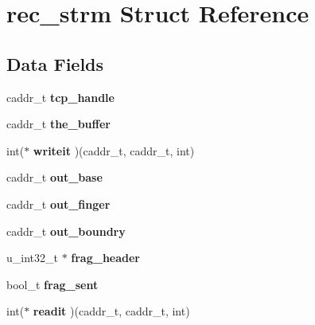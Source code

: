 \hypertarget{structrec__strm}{}\section{rec\+\_\+strm Struct Reference}
\label{structrec__strm}
\subsection*{Data Fields}
\begin{DoxyCompactItemize}
\item 
\mbox{\label{structrec__strm_a00be57c22e384888e493f40ff7fbab8c}} 
caddr\+\_\+t {\bfseries tcp\+\_\+handle}
\item 
\mbox{\label{structrec__strm_ae8bff9cab45be0d3484f0e7423533b4d}} 
caddr\+\_\+t {\bfseries the\+\_\+buffer}
\item 
\mbox{\label{structrec__strm_a5850837793c54c6c423088a36c7ea468}} 
int($\ast$ {\bfseries writeit} )(caddr\+\_\+t, caddr\+\_\+t, int)
\item 
\mbox{\label{structrec__strm_ac8ad744330bef112ca71cf73693853a8}} 
caddr\+\_\+t {\bfseries out\+\_\+base}
\item 
\mbox{\label{structrec__strm_ada87873ecbdf5e8b03eb5565b4ce93d7}} 
caddr\+\_\+t {\bfseries out\+\_\+finger}
\item 
\mbox{\label{structrec__strm_a9ebfb75ccaf1a1098c437135523ffa5b}} 
caddr\+\_\+t {\bfseries out\+\_\+boundry}
\item 
\mbox{\label{structrec__strm_a736be78af12470e68d4234810edf76c1}} 
u\+\_\+int32\+\_\+t $\ast$ {\bfseries frag\+\_\+header}
\item 
\mbox{\label{structrec__strm_a9ff756ffe44d90cc23375e43d2fbebd6}} 
bool\+\_\+t {\bfseries frag\+\_\+sent}
\item 
\mbox{\label{structrec__strm_a8e7ecbe27bf6a6280a824f9162e87186}} 
int($\ast$ {\bfseries readit} )(caddr\+\_\+t, caddr\+\_\+t, int)
\item 
\mbox{\label{structrec__strm_a6750e42ae9d619b38b42752e3a6ab1fd}} 

\end{DoxyCompactItemize}
